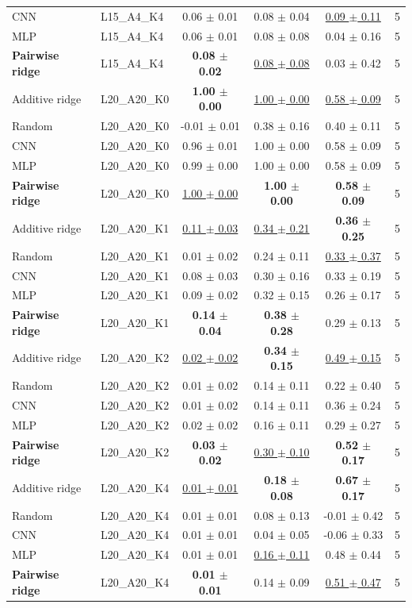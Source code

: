 \begin{tabular}{llcccc}
CNN & L15\_A4\_K4 & 0.06 $\pm$ 0.01 & 0.08 $\pm$ 0.04 & \underline{0.09 $\pm$ 0.11} & 5 \\
MLP & L15\_A4\_K4 & 0.06 $\pm$ 0.01 & 0.08 $\pm$ 0.08 & 0.04 $\pm$ 0.16 & 5 \\
\textbf{Pairwise ridge} & L15\_A4\_K4 & \textbf{0.08 $\pm$ 0.02} & \underline{0.08 $\pm$ 0.08} & 0.03 $\pm$ 0.42 & 5 \\
\midrule
Additive ridge & L20\_A20\_K0 & \textbf{1.00 $\pm$ 0.00} & \underline{1.00 $\pm$ 0.00} & \underline{0.58 $\pm$ 0.09} & 5 \\
Random & L20\_A20\_K0 & -0.01 $\pm$ 0.01 & 0.38 $\pm$ 0.16 & 0.40 $\pm$ 0.11 & 5 \\
CNN & L20\_A20\_K0 & 0.96 $\pm$ 0.01 & 1.00 $\pm$ 0.00 & 0.58 $\pm$ 0.09 & 5 \\
MLP & L20\_A20\_K0 & 0.99 $\pm$ 0.00 & 1.00 $\pm$ 0.00 & 0.58 $\pm$ 0.09 & 5 \\
\textbf{Pairwise ridge} & L20\_A20\_K0 & \underline{1.00 $\pm$ 0.00} & \textbf{1.00 $\pm$ 0.00} & \textbf{0.58 $\pm$ 0.09} & 5 \\
\midrule
Additive ridge & L20\_A20\_K1 & \underline{0.11 $\pm$ 0.03} & \underline{0.34 $\pm$ 0.21} & \textbf{0.36 $\pm$ 0.25} & 5 \\
Random & L20\_A20\_K1 & 0.01 $\pm$ 0.02 & 0.24 $\pm$ 0.11 & \underline{0.33 $\pm$ 0.37} & 5 \\
CNN & L20\_A20\_K1 & 0.08 $\pm$ 0.03 & 0.30 $\pm$ 0.16 & 0.33 $\pm$ 0.19 & 5 \\
MLP & L20\_A20\_K1 & 0.09 $\pm$ 0.02 & 0.32 $\pm$ 0.15 & 0.26 $\pm$ 0.17 & 5 \\
\textbf{Pairwise ridge} & L20\_A20\_K1 & \textbf{0.14 $\pm$ 0.04} & \textbf{0.38 $\pm$ 0.28} & 0.29 $\pm$ 0.13 & 5 \\
\midrule
Additive ridge & L20\_A20\_K2 & \underline{0.02 $\pm$ 0.02} & \textbf{0.34 $\pm$ 0.15} & \underline{0.49 $\pm$ 0.15} & 5 \\
Random & L20\_A20\_K2 & 0.01 $\pm$ 0.02 & 0.14 $\pm$ 0.11 & 0.22 $\pm$ 0.40 & 5 \\
CNN & L20\_A20\_K2 & 0.01 $\pm$ 0.02 & 0.14 $\pm$ 0.11 & 0.36 $\pm$ 0.24 & 5 \\
MLP & L20\_A20\_K2 & 0.02 $\pm$ 0.02 & 0.16 $\pm$ 0.11 & 0.29 $\pm$ 0.27 & 5 \\
\textbf{Pairwise ridge} & L20\_A20\_K2 & \textbf{0.03 $\pm$ 0.02} & \underline{0.30 $\pm$ 0.10} & \textbf{0.52 $\pm$ 0.17} & 5 \\
\midrule
Additive ridge & L20\_A20\_K4 & \underline{0.01 $\pm$ 0.01} & \textbf{0.18 $\pm$ 0.08} & \textbf{0.67 $\pm$ 0.17} & 5 \\
Random & L20\_A20\_K4 & 0.01 $\pm$ 0.01 & 0.08 $\pm$ 0.13 & -0.01 $\pm$ 0.42 & 5 \\
CNN & L20\_A20\_K4 & 0.01 $\pm$ 0.01 & 0.04 $\pm$ 0.05 & -0.06 $\pm$ 0.33 & 5 \\
MLP & L20\_A20\_K4 & 0.01 $\pm$ 0.01 & \underline{0.16 $\pm$ 0.11} & 0.48 $\pm$ 0.44 & 5 \\
\textbf{Pairwise ridge} & L20\_A20\_K4 & \textbf{0.01 $\pm$ 0.01} & 0.14 $\pm$ 0.09 & \underline{0.51 $\pm$ 0.47} & 5 \\
\bottomrule
\end{tabular}
